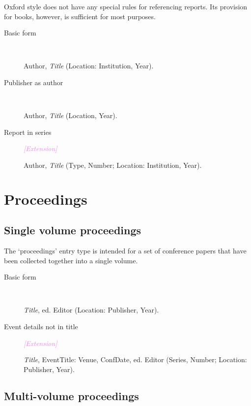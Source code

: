 \documentclass[extrafontsizes,11pt,a4paper,oneside]{memoir}
\newcommand*{\lit}[1]{\textsf{#1}}
\newcommand*{\code}[1]{`\textsf{#1}'}
\newcommand*{\aside}[1]{\textcolor{violet}{\emph{[#1]}}}
\begin{document}
Oxford style does not have any special rules for referencing reports. Its provision for books, however, is sufficient for most purposes.

\begin{description}
  \item[Basic form]~\par
  Author, \emph{Title} (Location: Institution, Year).
  \\
  
  \item[Publisher as author]~\par
  Author, \emph{Title} (Location, Year).
  \\
  
  \item[Report in series] \aside{Extension}\par
  Author, \emph{Title} (Type, Number; Location: Institution, Year).
\end{description} 

\section{Proceedings}\label{sec:proceedings}

\subsection{Single volume proceedings}

The \code{proceedings} entry type is intended for a set of conference papers that have been collected together into a single volume.

\begin{description}
  \item[Basic form]~\par
  \emph{Title}, \lit{ed.} Editor (Location: Publisher, Year).
  \\
  
  \item[Event details not in title] \aside{Extension}\par
  \emph{Title}, EventTitle: Venue, ConfDate, \lit{ed.} Editor (Series, Number; Location: Publisher, Year).
  \\
\end{description}

\subsection{Multi-volume proceedings}
\end{document}
